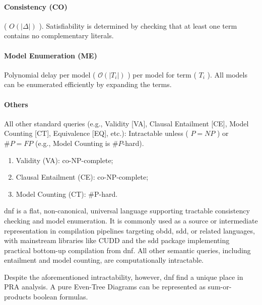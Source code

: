 \paragraph{Consistency (CO)} ( $O(\lvert \Delta\rvert)$ ). Satisfiability is determined by checking that at least one term contains no complementary literals.
\paragraph{Model Enumeration (ME)} Polynomial delay per model ( $\mathcal{O}(\lvert T_i\rvert)$ ) per model for term ( $T_i$ ). All models can be enumerated efficiently by expanding the terms.
\paragraph{Others} All other standard queries (e.g., Validity [VA], Clausal Entailment [CE], Model Counting [CT], Equivalence [EQ], etc.): Intractable unless ( $P=NP$ ) or $\#P=FP$ (e.g., Model Counting is $\#P$-hard).
\begin{enumerate}
    \item Validity (VA): co-NP-complete;
    \item Clausal Entailment (CE): co-NP-complete;
    \item Model Counting (CT): \#P-hard.
\end{enumerate}

\acrshort{dnf} is a flat, non-canonical, universal language supporting tractable consistency checking and model enumeration. It is commonly used as a source or intermediate representation in compilation pipelines targeting  \acrshort{obdd},  \acrshort{sdd}, or related languages, with mainstream libraries like CUDD and the  \acrshort{sdd} package implementing practical bottom-up compilation from \acrshort{dnf}. All other semantic queries, including entailment and model counting, are computationally intractable.

Despite the aforementioned intractability, however, \acrshort{dnf} find a unique place in PRA analysis. A pure Even-Tree Diagrams can be represented as sum-or-products boolean formulas.

